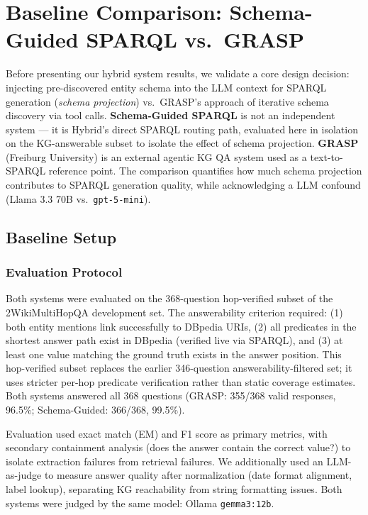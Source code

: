 \section{Baseline Comparison: Schema-Guided SPARQL vs.\ GRASP}
\label{sec:baseline-comparison}

Before presenting our hybrid system results, we validate a core design decision: injecting pre-discovered entity schema into the LLM context for SPARQL generation (\emph{schema projection}) vs.\ GRASP's approach of iterative schema discovery via tool calls. \textbf{Schema-Guided SPARQL} is not an independent system — it is Hybrid's direct SPARQL routing path, evaluated here in isolation on the KG-answerable subset to isolate the effect of schema projection. \textbf{GRASP} (Freiburg University) is an external agentic KG QA system used as a text-to-SPARQL reference point. The comparison quantifies how much schema projection contributes to SPARQL generation quality, while acknowledging a LLM confound (Llama 3.3 70B vs.\ \texttt{gpt-5-mini}).

\subsection{Baseline Setup}
\label{sec:baseline-setup}

\subsubsection{Evaluation Protocol}

Both systems were evaluated on the 368-question hop-verified subset of the 2WikiMultiHopQA development set. The answerability criterion required: (1) both entity mentions link successfully to DBpedia URIs, (2) all predicates in the shortest answer path exist in DBpedia (verified live via SPARQL), and (3) at least one value matching the ground truth exists in the answer position. This hop-verified subset replaces the earlier 346-question answerability-filtered set; it uses stricter per-hop predicate verification rather than static coverage estimates. Both systems answered all 368 questions (GRASP: 355/368 valid responses, 96.5\%; Schema-Guided: 366/368, 99.5\%).

Evaluation used exact match (EM) and F1 score as primary metrics, with secondary containment analysis (does the answer contain the correct value?) to isolate extraction failures from retrieval failures. We additionally used an LLM-as-judge to measure answer quality after normalization (date format alignment, label lookup), separating KG reachability from string formatting issues. Both systems were judged by the same model: Ollama \texttt{gemma3:12b}.

